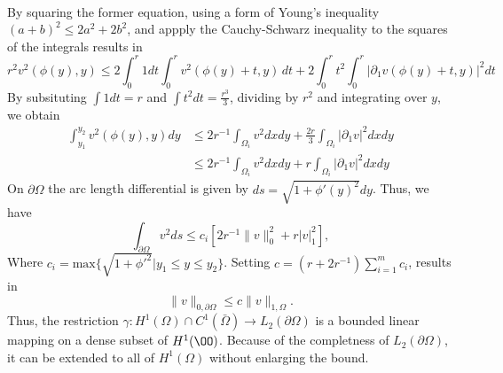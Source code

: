 \begin{bev}
\begin{align*}
    \end{align*}
    By squaring the former equation, using a form of Young's inequality ${(a+b)}^2 \leq 2a^2 + 2b^2$, and appply the Cauchy-Schwarz inequality to the squares of the integrals results in
    \begin{equation}
        r^2 v^2(\phi(y), y) \leq 2 \int_0^r 1 dt \int_0^r v^2(\phi(y) + t, y) \, dt +  2\int_0^r t^2 \int_0^r | \partial_1  v(\phi(y) + t, y) |^2 dt
    \end{equation}
    By subsituting $\int 1 dt = r$ and $\int t^2 dt = \frac{r^3}{3}$, dividing by $r^2$ and integrating over $y$, we obtain
    \begin{align*}
        \int_{y_1}^{y_2} v^2(\phi(y), y) dy &\leq  2r^{-1} \int_{\Omega_i} v^2 dx dy + \frac{2r}{3} \int_{\Omega_i} | \partial_1 v |^2 dx dy \\
        &\leq  2r^{-1} \int_{\Omega_i} v^2 dx dy + r \int_{\Omega_i} | \partial_1 v |^2 dx dy 
    \end{align*}
    On $\partial\Omega$ the arc length differential is given by $ds = \sqrt{1 + \phi'{(y)}^2} dy$. Thus, we have
    \begin{equation}
        \int_{\partial\Omega} v^2 ds \leq c_i \left[ 2r^{-1} \| v \|_0^2 + r | v |^2_1 \right],
    \end{equation}
    Where $c_i = \text{max}\{\sqrt{1+{\phi'}^2} | y_1 \leq y \leq y_2 \}$. Setting $c=(r+2r^{-1})\sum_{i=1}^m c_i$, results in
    \begin{equation}
        \| v \|_{0,\partial\Omega} \leq c \| v \|_{1,\Omega}.
    \end{equation}
    Thus, the restriction $\gamma : H^1(\Omega) \cap C^1(\bar{\Omega}) \to L_2(\partial \Omega)$ is a bounded linear mapping on a dense subset of $H^1(\OO)$. Because of the completness of $L_2(\partial \Omega)$, it can be extended to all of $H^1(\Omega)$ without enlarging the bound.
\end{bev}